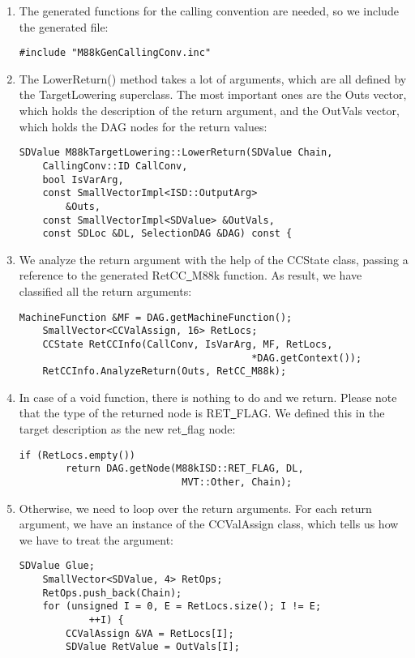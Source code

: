 \begin{enumerate}
\item The generated functions for the calling convention are needed, so we include the generated file:
\begin{lstlisting}[caption={}]
#include "M88kGenCallingConv.inc"
\end{lstlisting}

\item The LowerReturn() method takes a lot of arguments, which are all defined by the TargetLowering superclass. The most important ones are the Outs vector, which holds the description of the return argument, and the OutVals vector, which holds the DAG nodes for the return values:
\begin{lstlisting}[caption={}]
SDValue M88kTargetLowering::LowerReturn(SDValue Chain,
	CallingConv::ID CallConv,
	bool IsVarArg,
	const SmallVectorImpl<ISD::OutputArg>
		&Outs,
	const SmallVectorImpl<SDValue> &OutVals,
	const SDLoc &DL, SelectionDAG &DAG) const {
\end{lstlisting}

\item We analyze the return argument with the help of the CCState class, passing a reference to the generated RetCC\underline{~}M88k function. As result, we have classified all the return arguments:
\begin{lstlisting}[caption={}]
	MachineFunction &MF = DAG.getMachineFunction();
	SmallVector<CCValAssign, 16> RetLocs;
	CCState RetCCInfo(CallConv, IsVarArg, MF, RetLocs,
										*DAG.getContext());
	RetCCInfo.AnalyzeReturn(Outs, RetCC_M88k);
\end{lstlisting}

\item In case of a void function, there is nothing to do and we return. Please note that the type of the returned node is RET\underline{~}FLAG. We defined this in the target description as the new ret\underline{~}flag node:
\begin{lstlisting}[caption={}]
	if (RetLocs.empty())
		return DAG.getNode(M88kISD::RET_FLAG, DL,
							MVT::Other, Chain);
\end{lstlisting}

\item Otherwise, we need to loop over the return arguments. For each return argument, we have an instance of the CCValAssign class, which tells us how we have to treat the argument:
\begin{lstlisting}[caption={}]
	SDValue Glue;
	SmallVector<SDValue, 4> RetOps;
	RetOps.push_back(Chain);
	for (unsigned I = 0, E = RetLocs.size(); I != E;
			++I) {
		CCValAssign &VA = RetLocs[I];
		SDValue RetValue = OutVals[I];
\end{lstlisting}


\end{enumerate}
